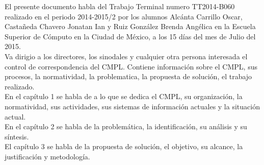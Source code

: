 El presente documento habla del Trabajo Terminal numero TT2014-B060 realizado en el periodo 2014-2015/2 por los alumnos Alcánta Carrillo Oscar, Castañeda Chavero Jonatan Ian y Ruiz González Brenda Angélica en la Escuela Superior de Cómputo en la Ciudad de México, a los 15 días del mes de Julio del 2015.\\

Va dirigio a los directores, los sinodales y cualquier otra persona interesada el control de correspondencia del CMPL. Contiene información sobre el CMPL, sus procesos, la normatividad, la problematica, la propuesta de solución, el trabajo realizado. \\

En el capítulo 1 se habla de a lo que se dedica el CMPL, su organización, la normatividad, sus actividades, sus sistemas de información actuales y la situación actual.\\
En el capítulo 2 se habla de la problemática, la identificación, su análisis y su síntesis. \\
El capítulo 3 se habla de la propuesta de solución, el objetivo, su alcance, la justificación y metodología.\\